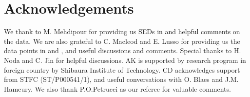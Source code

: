 \documentclass[a4paper,fleqn,usenatbib]{mnras}
\begin{document}
\section*{Acknowledgements}


We thank to M. Mehdipour  for providing us SEDs in
\cite{509,5548} and helpful comments on the data.  We are also grateful to
C. Macleod and E. Lusso for providing us the data points in
\cite{macleod2010} and \cite{lusso2017}, and useful discussions and
comments.  Special thanks to H. Noda and C. Jin for helpful discussions.  AK is
supported by research program in foreign country by Shibaura Institute
of Technology. CD acknowledges support from STFC (ST/P000541/1), and
useful conversations with O. Blaes and J.M. Hameury. 
We also thank P.O.Petrucci as our referee for valuable comments.






\end{document}
